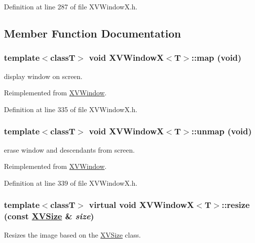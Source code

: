 Definition at line 287 of file XVWindow\-X.h.

\subsection{Member Function Documentation}
\label{XVWindowX_a0}
\hypertarget{class_XVWindowX_a0}{
\subsubsection[map]{\setlength{\rightskip}{0pt plus 5cm}template$<$classT$>$ void XVWindow\-X$<$T$>$::map (void)}}


display window on screen.



Reimplemented from \hyperlink{class_XVWindow}{XVWindow}.

Definition at line 335 of file XVWindow\-X.h.\label{XVWindowX_a1}
\hypertarget{class_XVWindowX_a1}{
\subsubsection[unmap]{\setlength{\rightskip}{0pt plus 5cm}template$<$classT$>$ void XVWindow\-X$<$T$>$::unmap (void)}}


erase window and descendants from screen.



Reimplemented from \hyperlink{class_XVWindow}{XVWindow}.

Definition at line 339 of file XVWindow\-X.h.\label{XVWindowX_a2}
\hypertarget{class_XVWindowX_a2}{
\subsubsection[resize]{\setlength{\rightskip}{0pt plus 5cm}template$<$classT$>$ virtual void XVWindow\-X$<$T$>$::resize (const \hyperlink{class_XVSize}{XVSize} \& {\em size})}}


Resizes the image based on the \hyperlink{class_XVSize}{XVSize} class.

